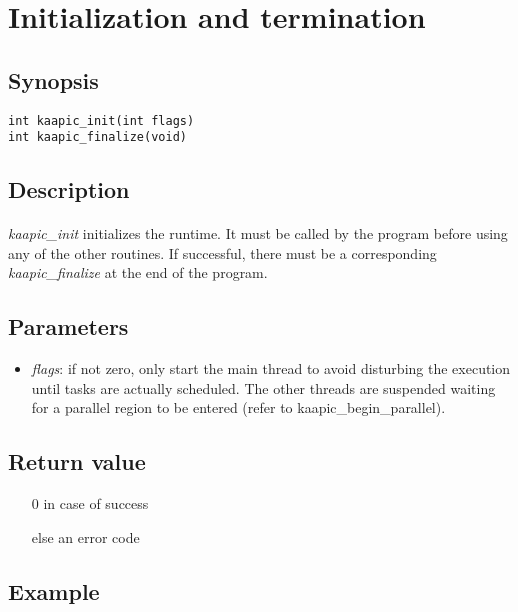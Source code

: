 \documentclass[a4paper, 11pt]{article}
\begin{document}
\newpage
\section{Initialization and termination}

\subsection{Synopsis}
\begin{small}
\lstset{language=C}
\begin{lstlisting}[frame=tb]
int kaapic_init(int flags)
int kaapic_finalize(void)
\end{lstlisting}
\end{small}

\subsection{Description}
\paragraph{}
\textit{kaapic\_init} initializes the runtime. 
It must be called  by the program before using any of the other routines. 
If successful, there must be a
corresponding \textit{kaapic\_finalize} at the end of the program.

\subsection{Parameters}
\begin{itemize}
\item \textit{flags}: if not zero, only start the main thread to avoid disturbing
the execution until tasks are actually scheduled. The other threads are suspended
waiting for a parallel region to be entered (refer to kaapic\_begin\_parallel).
\end{itemize}

\subsection{Return value}
\begin{itemize}
\item [0] in case of success
\item [else] an error code
\end{itemize}

\subsection{Example}
\end{document}
